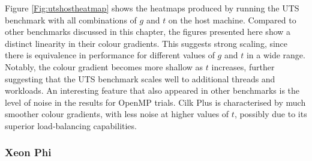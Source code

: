 \documentclass{report}
\begin{document}
Figure \ref{Fig:utshostheatmap} shows the heatmaps produced by running the UTS benchmark with all combinations of \(g\) and \(t\) on the host machine. Compared to other benchmarks discussed in this chapter, the figures presented here show a distinct linearity in their colour gradients. This suggests strong scaling, since there is equivalence in performance for different values of \(g\) and \(t\) in a wide range. Notably, the colour gradient becomes more shallow as \(t\) increases, further suggesting that the UTS benchmark scales well to additional threads and workloads. An interesting feature that also appeared in other benchmarks is the level of noise in the results for OpenMP trials. Cilk Plus is characterised by much smoother colour gradients, with less noise at higher values of  \(t\), possibly due to its superior load-balancing capabilities.

\subsubsection{Xeon Phi}
\end{document}
